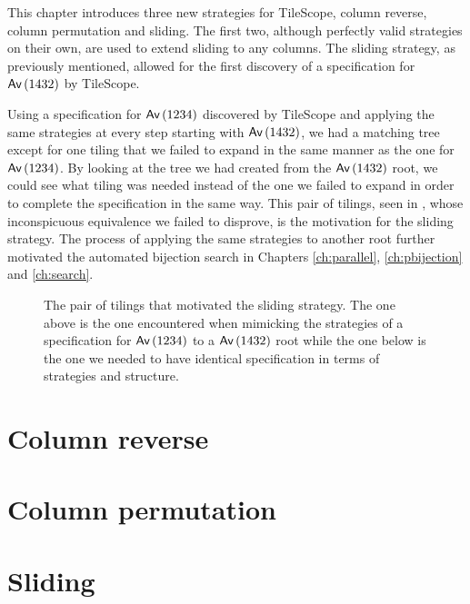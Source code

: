 \label{ch:strats}
This chapter introduces three new strategies for TileScope, column reverse, column permutation and sliding. The first two, although perfectly valid strategies on their own, are used to extend sliding to any columns. The sliding strategy, as previously mentioned, allowed for the first discovery of a specification for $\textsf{Av}\left(1432\right)$ by TileScope. 

Using a specification for $\textsf{Av}\left(1234\right)$ discovered by TileScope and applying the same strategies at every step starting with $\textsf{Av}\left(1432\right)$, we had a matching tree except for one tiling that we failed to expand in the same manner as the one for $\textsf{Av}\left(1234\right)$. By looking at the tree we had created from the $\textsf{Av}\left(1432\right)$ root, we could see what tiling was needed instead of the one we failed to expand in order to complete the specification in the same way. This pair of tilings, seen in , whose inconspicuous equivalence we failed to disprove, is the motivation for the sliding strategy. The process of applying the same strategies to another root further motivated the automated bijection search in Chapters \ref{ch:parallel}, \ref{ch:pbijection} and \ref{ch:search}.

\begin{figure}[ht!]
    \centering
    
    \caption{The pair of tilings that motivated the sliding strategy. The one above is the one encountered when mimicking the strategies of a specification for $\textsf{Av}\left(1234\right)$ to a $\textsf{Av}\left(1432\right)$ root while the one below is the one we needed to have identical specification in terms of strategies and structure.}
    \label{fig:slidepair}
\end{figure}

\section{Column reverse}

\section{Column permutation}

\section{Sliding}
